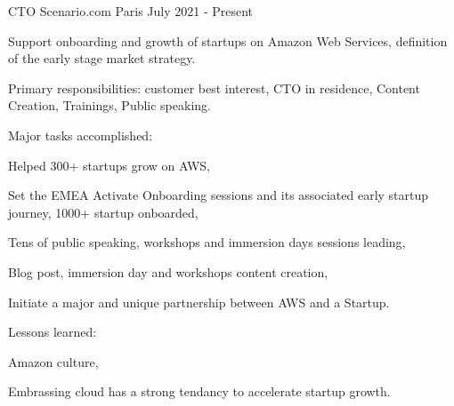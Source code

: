 

\begin{cventries}

\cventry
{CTO} %
{Scenario.com} %
{Paris} %
{July 2021 - Present} %
{
  \begin{cvitems} %
    \item {Support onboarding and growth of startups on Amazon Web Services, definition of the early stage market strategy.}
    \item {Primary responsibilities: customer best interest, CTO in residence, Content Creation, Trainings, Public speaking.}
    \item {Major tasks accomplished:}
    \begin{cvsubitems}
      \item {Helped 300+ startups grow on AWS,}
      \item {Set the EMEA Activate Onboarding sessions and its associated early startup journey, 1000+ startup onboarded,}
      \item {Tens of public speaking, workshops and immersion days sessions leading,}
      \item {Blog post, immersion day and workshops content creation,}
      \item {Initiate a major and unique partnership between AWS and a Startup.}
    \end{cvsubitems}
    \item {Lessons learned:}
    \begin{cvsubitems}
      \item {Amazon culture,}
      \item {Embrassing cloud has a strong tendancy to accelerate startup growth.}
    \end{cvsubitems}
  \end{cvitems}
}


\end{cventries}
